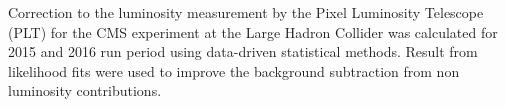 Correction to the luminosity measurement by the Pixel Luminosity Telescope (PLT) for the CMS experiment at the Large Hadron Collider was calculated for 2015 and 2016 run period using data-driven statistical methods. Result from likelihood fits were used to improve the background subtraction from non luminosity contributions.



